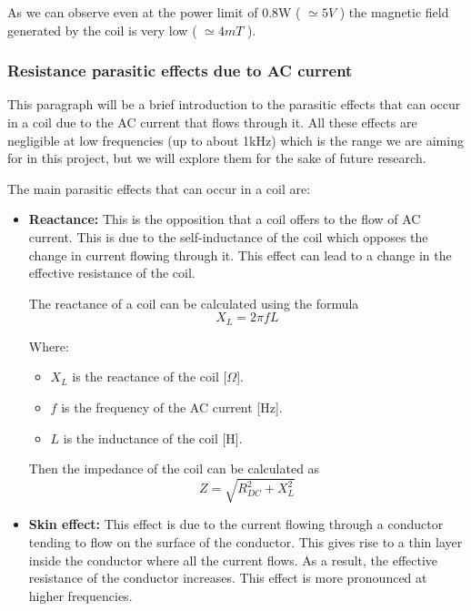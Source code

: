 As we can observe even at the power limit of 0.8W ( $\simeq 5V$ ) the magnetic field generated by the coil is very low ( $\simeq 4mT$ ).

\subsubsection{Resistance parasitic effects due to AC current}
This paragraph will be a brief introduction to the parasitic effects that can occur in a coil due to the AC current that flows through it. All these effects are negligible at low frequencies (up to about 1kHz) which is the range we are aiming for in this project, but we will explore them for the sake of future research.

The main parasitic effects that can occur in a coil are:
\begin{itemize}
    \item \textbf{Reactance:} This is the opposition that a coil offers to the flow of AC current. This is due to the self-inductance of the coil which opposes the change in current flowing through it. This effect can lead to a change in the effective resistance of the coil.
    
    The reactance of a coil can be calculated using the formula
    \begin{equation}
        X_L = 2 \pi f L
    \end{equation}
        
    Where:
    \begin{itemize}
        \item \( X_L \) is the reactance of the coil [\(\Omega\)].
        \item \( f \) is the frequency of the AC current [Hz].
        \item \( L \) is the inductance of the coil [H].
    \end{itemize}

    Then the impedance of the coil can be calculated as
    \begin{equation}
        Z = \sqrt{R_{DC}^2 + X_L^2}
    \end{equation}


    \item \textbf{Skin effect:} This effect is due to the current flowing through a conductor tending to flow on the surface of the conductor. This gives rise to a thin layer inside the conductor where all the current flows. As a result, the effective resistance of the conductor increases. This effect is more pronounced at higher frequencies.
    

\end{itemize}
